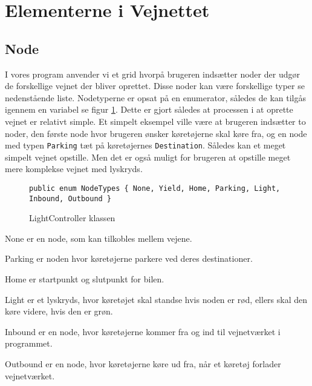 \section{Elementerne i Vejnettet}\label{ElementerVejnettet}
\subsection{Node}
I vores program anvender vi et grid hvorpå brugeren indsætter noder der udgør de forskellige vejnet der bliver oprettet. Disse noder kan være forskellige typer se nedenstående liste. Nodetyperne er opsat på en enumerator, således de kan tilgås igennem en variabel se figur \ref{enumNodeTypes}. Dette er gjort således at processen i at oprette vejnet er relativt simple. Et simpelt eksempel ville være at brugeren indsætter to noder, den første node hvor brugeren ønsker køretøjerne skal køre fra, og en node med typen \texttt{Parking} tæt på køretøjernes \texttt{Destination}. Således kan et meget simpelt vejnet opstille. Men det er også muligt for brugeren at opstille meget mere komplekse vejnet med lyskryds.

\begin{figure}[H]
\begin{lstlisting}
public enum NodeTypes { None, Yield, Home, Parking, Light, Inbound, Outbound }
\end{lstlisting}
\caption{LightController klassen}\label{enumNodeTypes}
\end{figure}

\begin{desciption}
\item[None] er en node, som kan tilkobles mellem vejene.
\item[Parking] er noden hvor køretøjerne parkere ved deres destinationer.
\item[Home] er startpunkt og slutpunkt for bilen.
\item[Light] er et lyskryds, hvor køretøjet skal standse hvis noden er rød, ellers skal den køre videre, hvis den er grøn.
\item[Inbound] er en node, hvor køretøjerne kommer fra og ind til vejnetværket i programmet.
\item[Outbound] er en node, hvor køretøjerne køre ud fra, når et køretøj forlader vejnetværket.
\end{desciption}

